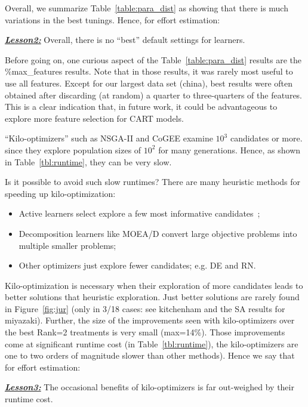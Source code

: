 \documentclass[10pt,conference]{IEEEtran}
\newcommand{\bi}{\begin{itemize}}
\newcommand{\ei}{\end{itemize}}
\newenvironment{result}[2]
{\begin{myshadowbox}\textbf{\textit{\underline{Lesson#1:}}} #2}{ 
\end{myshadowbox}}
\begin{document}
Overall, we summarize Table~\ref{table:para_dist} as showing that there is 
much variations in the best tunings. 
Hence, for effort estimation:

 \begin{result}{2}
 Overall, there is no ``best'' default settings for
 learners.
 \end{result}

Before going on, one curious aspect of the Table~\ref{table:para_dist} results are the 
\%max\_features results. Note that in those results, it was rarely most useful to use all features. Except for our largest data set (china), best results were often obtained after discarding (at random) a quarter to three-quarters of the features. This is a clear indication that, in future work, it could be advantageous to explore more feature selection for CART models.

 
 


``Kilo-optimizers'' such as  NSGA-II and CoGEE examine $10^3$ candidates or more.
since  they explore population sizes
of $10^2$ for many generations. Hence, as shown in Table~\ref{tbl:runtime},
they can be very slow.

Is it possible to avoid such slow runtimes?
There are many heuristic methods for speeding up
kilo-optimization:
\bi
\item Active learners  select explore a few most informative candidates~\cite{krall15};
\item Decomposition learners like MOEA/D  convert large
objective problems into multiple smaller problems;
\item
Other optimizers just explore   fewer candidates;
e.g.    DE and RN.
\ei

Kilo-optimization is necessary when their exploration of  more candidates leads to better solutions that heuristic exploration.
Just better solutions are rarely found in Figure~\ref{fig:jur} (only in 3/18 cases: see kitchenham and the SA results for miyazaki). Further, the size of the improvements
seen with kilo-optimizers   over the best Rank=2 treatments is very small (max=14\%).
Those improvements come at significant runtime cost (in Table~\ref{tbl:runtime}), the kilo-optimizers
are one to two orders of magnitude slower than other methods). Hence we say that for effort estimation:

    \begin{result}{3}
    The occasional benefits of kilo-optimizers is far out-weighed by their runtime cost.
 \end{result}
  
\end{document}
